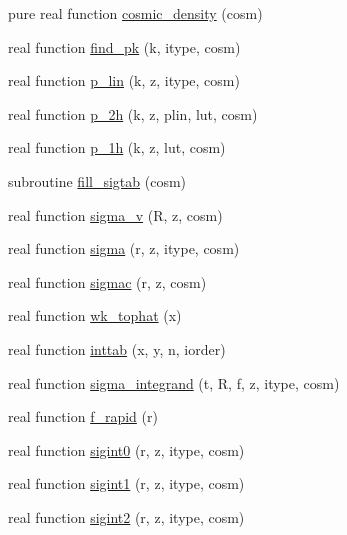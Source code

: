 \begin{DoxyCompactItemize}
\item 
pure real function \mbox{\hyperlink{namespacenonlinear_a8d293985858b08d5e5c5bbdcdc9d4280}{cosmic\+\_\+density}} (cosm)
\item 
real function \mbox{\hyperlink{namespacenonlinear_ad7792185b1262569016446c4cba41606}{find\+\_\+pk}} (k, itype, cosm)
\item 
real function \mbox{\hyperlink{namespacenonlinear_ad2f542da0cba1686588e83dec8ac7617}{p\+\_\+lin}} (k, z, itype, cosm)
\item 
real function \mbox{\hyperlink{namespacenonlinear_adbb028d781be22805e7c1468b4e795a8}{p\+\_\+2h}} (k, z, plin, lut, cosm)
\item 
real function \mbox{\hyperlink{namespacenonlinear_a6734815086cf4dca34d8677f1d763e3f}{p\+\_\+1h}} (k, z, lut, cosm)
\item 
subroutine \mbox{\hyperlink{namespacenonlinear_a0ec694303c1335ceb97e09d20f0ceb94}{fill\+\_\+sigtab}} (cosm)
\item 
real function \mbox{\hyperlink{namespacenonlinear_a66f93056c25bc48a5cfb206e596b47ad}{sigma\+\_\+v}} (R, z, cosm)
\item 
real function \mbox{\hyperlink{namespacenonlinear_a5ecb478e809d6e8e185d11dea143cd69}{sigma}} (r, z, itype, cosm)
\item 
real function \mbox{\hyperlink{namespacenonlinear_a2b1a2fe15822f8bfcf88ca9de9060e85}{sigmac}} (r, z, cosm)
\item 
real function \mbox{\hyperlink{namespacenonlinear_a96a394ea7d173aec659a73ff09f548c6}{wk\+\_\+tophat}} (x)
\item 
real function \mbox{\hyperlink{namespacenonlinear_ab7465123b12f301a0d4d5a80c8b35ab5}{inttab}} (x, y, n, iorder)
\item 
real function \mbox{\hyperlink{namespacenonlinear_a752ac5f748fd7d780ac59ee3a8b4d267}{sigma\+\_\+integrand}} (t, R, f, z, itype, cosm)
\item 
real function \mbox{\hyperlink{namespacenonlinear_a2a0c300b39b9de3d6b00be6369b59944}{f\+\_\+rapid}} (r)
\item 
real function \mbox{\hyperlink{namespacenonlinear_ad4ec869211d722d92d942360f0619e6e}{sigint0}} (r, z, itype, cosm)
\item 
real function \mbox{\hyperlink{namespacenonlinear_ac0dc62ceea1e6ba2e1b7a08a420d934e}{sigint1}} (r, z, itype, cosm)
\item 
real function \mbox{\hyperlink{namespacenonlinear_a7f3d1c8e1e8b16f59cf8a1d0b6cd5499}{sigint2}} (r, z, itype, cosm)
\item 

\end{DoxyCompactItemize}

